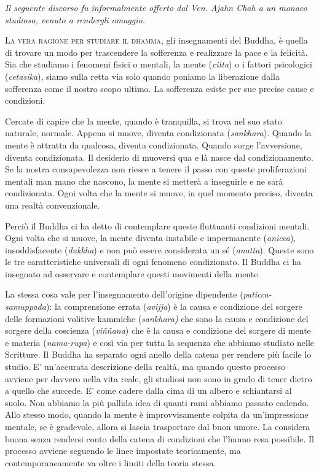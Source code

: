 
\textit{Il seguente discorso fu informalmente offerto dal Ven. Ajahn Chah a un
monaco studioso, venuto a rendergli omaggio.}

{\scshape La vera ragione per studiare il dhamma}, gli insegnamenti del Buddha, è
quella di trovare un modo per trascendere la sofferenza e realizzare la
pace e la felicità. Sia che studiamo i fenomeni fisici o mentali, la
mente (\emph{citta}) o i fattori psicologici (\emph{cetasika}), siamo
sulla retta via solo quando poniamo la liberazione dalla sofferenza come
il nostro scopo ultimo. La sofferenza esiste per sue precise cause e
condizioni.

Cercate di capire che la mente, quando è tranquilla, si trova nel suo
stato naturale, normale. Appena si muove, diventa condizionata
(\emph{sankhara}). Quando la mente è attratta da qualcosa, diventa
condizionata. Quando sorge l'avversione, diventa condizionata. Il
desiderio di muoversi qua e là nasce dal condizionamento. Se la nostra
consapevolezza non riesce a tenere il passo con queste proliferazioni
mentali man mano che nascono, la mente si metterà a inseguirle e ne sarà
condizionata. Ogni volta che la mente si muove, in quel momento preciso,
diventa una realtà convenzionale.

Perciò il Buddha ci ha detto di contemplare queste fluttuanti condizioni
mentali. Ogni volta che si muove, la mente diventa instabile e
impermanente (\emph{anicca}), insoddisfacente (\emph{dukkha}) e non può
essere considerata un sé (\emph{anatta}). Queste sono le tre
caratteristiche universali di ogni fenomeno condizionato. Il Buddha ci
ha insegnato ad osservare e contemplare questi movimenti della mente.

La stessa cosa vale per l'insegnamento dell'origine dipendente
(\emph{paticca-samuppada}): la comprensione errata (\emph{avijja}) è la
causa e condizione del sorgere delle formazioni volitive kammiche
(\emph{sankhara)} che sono la causa e condizione del sorgere della
coscienza (\emph{viññana}) che è la causa e condizione del sorgere di
mente e materia (\emph{nama-rupa}) e così via per tutta la sequenza che
abbiamo studiato nelle Scritture. Il Buddha ha separato ogni anello
della catena per rendere più facile lo studio. E' un'accurata
descrizione della realtà, ma quando questo processo avviene per davvero
nella vita reale, gli studiosi non sono in grado di tener dietro a
quello che succede. E' come cadere dalla cima di un albero e schiantarsi
al suolo. Non abbiamo la più pallida idea di quanti rami abbiamo passato
cadendo. Allo stesso modo, quando la mente è improvvisamente colpita da
un'impressione mentale, se è gradevole, allora si lascia trasportare dal
buon umore. La considera buona senza rendersi conto della catena di
condizioni che l'hanno resa possibile. Il processo avviene seguendo le
linee impostate teoricamente, ma contemporaneamente va oltre i limiti
della teoria stessa.

